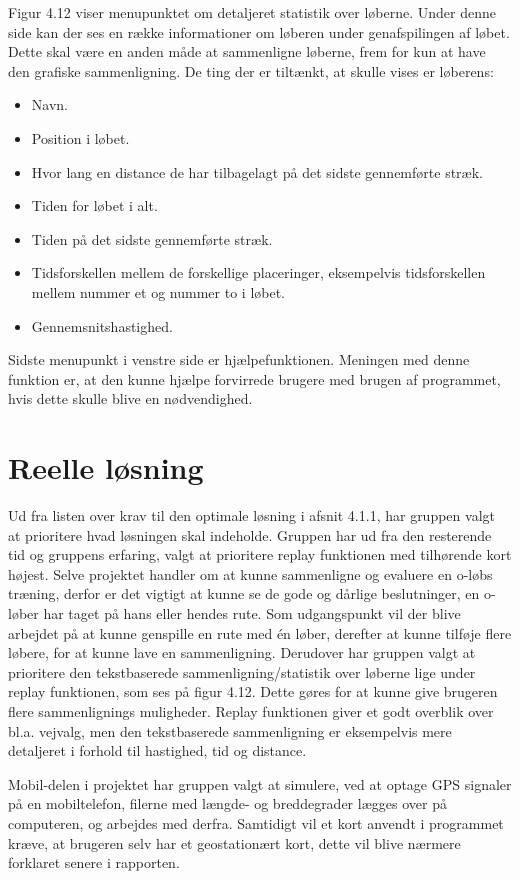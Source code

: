 Figur 4.12 viser menupunktet om detaljeret statistik over løberne. Under denne side kan der ses en række informationer om løberen under genafspilingen af løbet. Dette skal være en anden måde at sammenligne løberne, frem for kun at have den grafiske sammenligning. De ting der er tiltænkt, at skulle vises er løberens:
\begin{itemize}
	\item Navn.
	\item Position i løbet.
	\item Hvor lang en distance de har tilbagelagt på det sidste gennemførte stræk.
	\item Tiden for løbet i alt.
	\item Tiden på det sidste gennemførte stræk.
	\item Tidsforskellen mellem de forskellige placeringer, eksempelvis tidsforskellen mellem nummer et og nummer to i løbet.
	\item Gennemsnitshastighed.
\end{itemize}

Sidste menupunkt i venstre side er hjælpefunktionen. Meningen med denne funktion er, at den kunne hjælpe forvirrede brugere med brugen af programmet, hvis dette skulle blive en nødvendighed.

\section{Reelle løsning}
Ud fra listen over krav til den optimale løsning i afsnit 4.1.1, har gruppen valgt at prioritere hvad løsningen skal indeholde. Gruppen har ud fra den resterende tid og gruppens erfaring, valgt at prioritere replay funktionen med tilhørende kort højest. Selve projektet handler om at kunne sammenligne og evaluere en o-løbs træning, derfor er det vigtigt at kunne se de gode og dårlige beslutninger, en o-løber har taget på hans eller hendes rute. Som udgangspunkt vil der blive arbejdet på at kunne genspille en rute med én løber, derefter at kunne tilføje flere løbere, for at kunne lave en sammenligning. Derudover har gruppen valgt at prioritere den tekstbaserede sammenligning/statistik over løberne lige under replay funktionen, som ses på figur 4.12. Dette gøres for at kunne give brugeren flere sammenlignings muligheder. Replay funktionen giver et godt overblik over bl.a. vejvalg, men den tekstbaserede sammenligning er eksempelvis mere detaljeret i forhold til hastighed, tid og distance.

Mobil-delen i projektet har gruppen valgt at simulere, ved at optage GPS signaler på en mobiltelefon, filerne med længde- og breddegrader lægges over på computeren, og arbejdes med derfra. Samtidigt vil et kort anvendt i programmet kræve, at brugeren selv har et geostationært kort, dette vil blive nærmere forklaret senere i rapporten.

